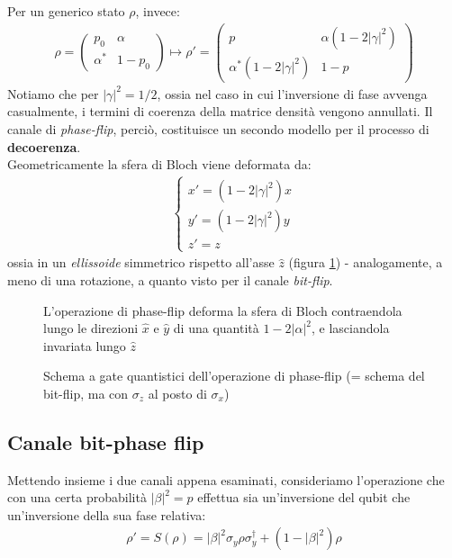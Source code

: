 \documentclass[../../InformazioneQuantistica.tex]{subfiles}
\begin{document}
Per un generico stato $\rho$, invece:
\begin{align}
    \rho = \begin{pmatrix}
    p_0 & \alpha\\
    \alpha^* & 1-p_0
    \end{pmatrix} \mapsto \rho' = \begin{pmatrix}
    p & \alpha(1 - 2|\gamma|^2)\\
    \alpha^*(1-2|\gamma|^2) & 1-p
    \end{pmatrix}
    \label{eqn:phase-flip-matrix}
\end{align}
Notiamo che per $|\gamma|^2 = 1/2$, ossia nel caso in cui l'inversione di fase avvenga casualmente, i termini di coerenza della matrice densità vengono annullati. Il canale di \textit{phase-flip}, perciò, costituisce un secondo modello per il processo di \textbf{decoerenza}.\\

Geometricamente la sfera di Bloch viene deformata da:
\begin{align*}
    \begin{cases}
    x' = (1-2|\gamma|^2)x\\
    y' = (1-2|\gamma|^2)y\\
    z' = z
    \end{cases}
\end{align*}
ossia in un \textit{ellissoide} simmetrico rispetto all'asse $\hat{z}$ (figura \ref{fig:bit-phaseflip-geometrica}) - analogamente, a meno di una rotazione, a quanto visto per il canale \textit{bit-flip}.

\begin{figure}[H]
\centering

\caption{L'operazione di phase-flip deforma la sfera di Bloch contraendola lungo le direzioni $\hat{x}$ e $\hat{y}$ di una quantità $1-2|\alpha|^2$, e lasciandola invariata lungo $\hat{z}$\label{fig:bit-phaseflip-geometrica}}
\end{figure}


\begin{figure}[H]
\centering

\caption{Schema a gate quantistici dell'operazione di phase-flip (= schema del bit-flip, ma con $\sigma_z$ al posto di $\sigma_x$)\label{fig:phase-flip}}
\end{figure}

\subsection{Canale bit-phase flip}
Mettendo insieme i due canali appena esaminati, consideriamo l'operazione che con una certa probabilità $|\beta|^2 = p$ effettua sia un'inversione del qubit che un'inversione  della sua fase relativa:
 \begin{align*}
\rho'=S(\rho) = |\beta|^2 \sigma_y \rho \sigma_y^\dag + (1-|\beta|^2 )\rho
\end{align*}
\end{document}
